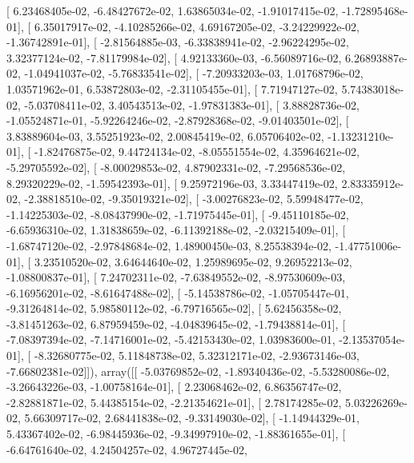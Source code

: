 \documentclass{article}
\begin{document}
       [  6.23468405e-02,  -6.48427672e-02,   1.63865034e-02,
         -1.91017415e-02,  -1.72895468e-01],
       [  6.35017917e-02,  -4.10285266e-02,   4.69167205e-02,
         -3.24229922e-02,  -1.36742891e-01],
       [ -2.81564885e-03,  -6.33838941e-02,  -2.96224295e-02,
          3.32377124e-02,  -7.81179984e-02],
       [  4.92133360e-03,  -6.56089716e-02,   6.26893887e-02,
         -1.04941037e-02,  -5.76833541e-02],
       [ -7.20933203e-03,   1.01768796e-02,   1.03571962e-01,
          6.53872803e-02,  -2.31105455e-01],
       [  7.71947127e-02,   5.74383018e-02,  -5.03708411e-02,
          3.40543513e-02,  -1.97831383e-01],
       [  3.88828736e-02,  -1.05524871e-01,  -5.92264246e-02,
         -2.87928368e-02,  -9.01403501e-02],
       [  3.83889604e-03,   3.55251923e-02,   2.00845419e-02,
          6.05706402e-02,  -1.13231210e-01],
       [ -1.82476875e-02,   9.44724134e-02,  -8.05551554e-02,
          4.35964621e-02,  -5.29705592e-02],
       [ -8.00029853e-02,   4.87902331e-02,  -7.29568536e-02,
          8.29320229e-02,  -1.59542393e-01],
       [  9.25972196e-03,   3.33447419e-02,   2.83335912e-02,
         -2.38818510e-02,  -9.35019321e-02],
       [ -3.00276823e-02,   5.59948477e-02,  -1.14225303e-02,
         -8.08437990e-02,  -1.71975445e-01],
       [ -9.45110185e-02,  -6.65936310e-02,   1.31838659e-02,
         -6.11392188e-02,  -2.03215409e-01],
       [ -1.68747120e-02,  -2.97848684e-02,   1.48900450e-03,
          8.25538394e-02,  -1.47751006e-01],
       [  3.23510520e-02,   3.64644640e-02,   1.25989695e-02,
          9.26952213e-02,  -1.08800837e-01],
       [  7.24702311e-02,  -7.63849552e-02,  -8.97530609e-03,
         -6.16956201e-02,  -8.61647488e-02],
       [ -5.14538786e-02,  -1.05705447e-01,  -9.31264814e-02,
          5.98580112e-02,  -6.79716565e-02],
       [  5.62456358e-02,  -3.81451263e-02,   6.87959459e-02,
         -4.04839645e-02,  -1.79438814e-01],
       [ -7.08397394e-02,  -7.14716001e-02,  -5.42153430e-02,
          1.03983600e-01,  -2.13537054e-01],
       [ -8.32680775e-02,   5.11848738e-02,   5.32312171e-02,
         -2.93673146e-03,  -7.66802381e-02]]), array([[ -5.03769852e-02,  -1.89340436e-02,  -5.53280086e-02,
         -3.26643226e-03,  -1.00758164e-01],
       [  2.23068462e-02,   6.86356747e-02,  -2.82881871e-02,
          5.44385154e-02,  -2.21354621e-01],
       [  2.78174285e-02,   5.03226269e-02,   5.66309717e-02,
          2.68441838e-02,  -9.33149030e-02],
       [ -1.14944329e-01,   5.43367402e-02,  -6.98445936e-02,
         -9.34997910e-02,  -1.88361655e-01],
       [ -6.64761640e-02,   4.24504257e-02,   4.96727445e-02,
\end{document}

